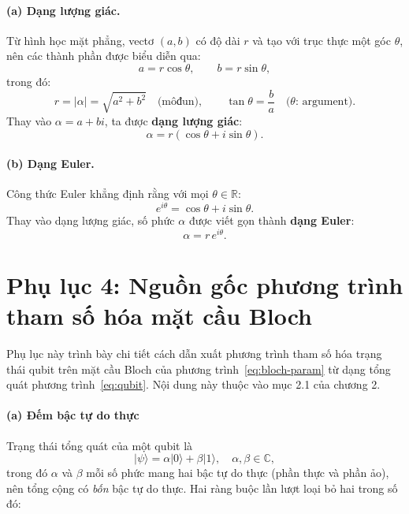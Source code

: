\paragraph{(a) Dạng lượng giác.}
Từ hình học mặt phẳng, vectơ $(a, b)$ có độ dài $r$ và tạo với trục thực một góc
$\theta$, nên các thành phần được biểu diễn qua:
$$a = r\cos\theta, \qquad b = r\sin\theta,$$
trong đó:
$$r = |\alpha| = \sqrt{a^2 + b^2} \quad \text{(môđun)},
\qquad \tan\theta = \frac{b}{a} \quad \text{($\theta$: argument)}.$$
Thay vào $\alpha = a + bi$, ta được \textbf{dạng lượng giác}:
$$\alpha = r(\cos\theta + i\sin\theta).$$

\paragraph{(b) Dạng Euler.}
Công thức Euler khẳng định rằng với mọi $\theta \in \mathbb{R}$:
$$e^{i\theta} = \cos\theta + i\sin\theta.$$
Thay vào dạng lượng giác, số phức $\alpha$ được viết gọn thành
\textbf{dạng Euler}:
\begin{equation}
    \alpha = r\,e^{i\theta}.
    \label{eq:euler}
\end{equation}

\section*{Phụ lục 4: Nguồn gốc phương trình tham số hóa mặt cầu Bloch}

Phụ lục này trình bày chi tiết cách dẫn xuất phương trình tham số hóa trạng thái
qubit trên mặt cầu Bloch của phương trình~\eqref{eq:bloch-param} từ dạng tổng quát phương trình~\eqref{eq:qubit}. Nội dung này thuộc vào mục 2.1 của chương 2.

\paragraph{(a) Đếm bậc tự do thực}

Trạng thái tổng quát của một qubit là
\[
    |\psi\rangle = \alpha|0\rangle + \beta|1\rangle,
    \quad \alpha, \beta \in \mathbb{C},
\]
trong đó $\alpha$ và $\beta$ mỗi số phức mang hai bậc tự do thực (phần thực và
phần ảo), nên tổng cộng có \emph{bốn} bậc tự do thực. Hai ràng buộc lần lượt
loại bỏ hai trong số đó:

